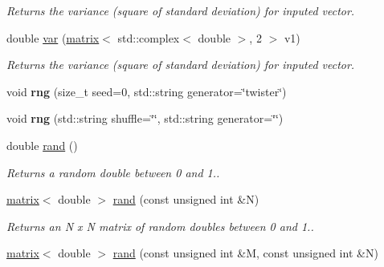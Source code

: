 \begin{DoxyCompactItemize}
\begin{DoxyCompactList}\small\item\em Returns the variance (square of standard deviation) for inputed vector. \end{DoxyCompactList}\item 
\hypertarget{namespacekeycpp_ac94ac14515f1da6cebf6f5d924bd1a35}{double \hyperlink{namespacekeycpp_ac94ac14515f1da6cebf6f5d924bd1a35}{var} (\hyperlink{classkeycpp_1_1matrix}{matrix}$<$ std\-::complex$<$ double $>$, 2 $>$ v1)}\label{namespacekeycpp_ac94ac14515f1da6cebf6f5d924bd1a35}

\begin{DoxyCompactList}\small\item\em Returns the variance (square of standard deviation) for inputed vector. \end{DoxyCompactList}\item 
\hypertarget{namespacekeycpp_a93e133b94bc27c9b984d0383b01772d4}{void {\bfseries rng} (size\-\_\-t seed=0, std\-::string generator=\char`\"{}twister\char`\"{})}\label{namespacekeycpp_a93e133b94bc27c9b984d0383b01772d4}

\item 
\hypertarget{namespacekeycpp_af2478c69f713d8664b53d31f25718530}{void {\bfseries rng} (std\-::string shuffle=\char`\"{}\char`\"{}, std\-::string generator=\char`\"{}\char`\"{})}\label{namespacekeycpp_af2478c69f713d8664b53d31f25718530}

\item 
\hypertarget{namespacekeycpp_a5ef5c1f5951e8182a7c4ec9612f3f7e1}{double \hyperlink{namespacekeycpp_a5ef5c1f5951e8182a7c4ec9612f3f7e1}{rand} ()}\label{namespacekeycpp_a5ef5c1f5951e8182a7c4ec9612f3f7e1}

\begin{DoxyCompactList}\small\item\em Returns a random double between 0 and 1.. \end{DoxyCompactList}\item 
\hypertarget{namespacekeycpp_ab99a9561cf5654ae722a0879b41d9d73}{\hyperlink{classkeycpp_1_1matrix}{matrix}$<$ double $>$ \hyperlink{namespacekeycpp_ab99a9561cf5654ae722a0879b41d9d73}{rand} (const unsigned int \&N)}\label{namespacekeycpp_ab99a9561cf5654ae722a0879b41d9d73}

\begin{DoxyCompactList}\small\item\em Returns an N x N matrix of random doubles between 0 and 1.. \end{DoxyCompactList}\item 
\hypertarget{namespacekeycpp_af6413232f2de6f8ac96efde6531c3055}{\hyperlink{classkeycpp_1_1matrix}{matrix}$<$ double $>$ \hyperlink{namespacekeycpp_af6413232f2de6f8ac96efde6531c3055}{rand} (const unsigned int \&M, const unsigned int \&N)}\label{namespacekeycpp_af6413232f2de6f8ac96efde6531c3055}


\end{DoxyCompactItemize}
